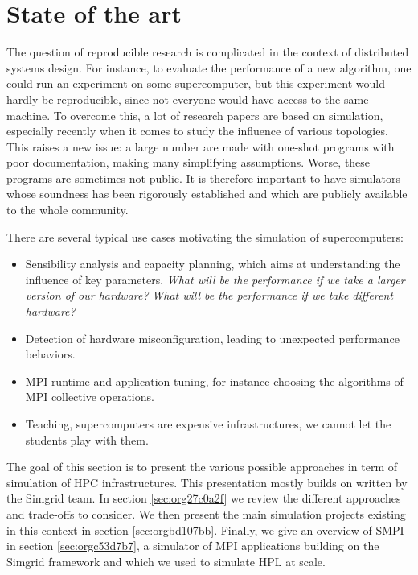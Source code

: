 \documentclass[12pt, a4paper]{memoir}
\begin{document}
\chapter{State of the art}
\label{sec:orgf52ffec}
The question of reproducible research is complicated in the context of distributed systems design. For instance, to
evaluate the performance of a new algorithm, one could run an experiment on some supercomputer, but this experiment
would hardly be reproducible, since not everyone would have access to the same machine. To overcome this, a lot of
research papers are based on simulation, especially recently when it comes to study the influence of various
topologies. This raises a new issue: a large number are made with one-shot programs with poor documentation, making
many simplifying assumptions. Worse, these programs are sometimes not public. It is therefore important to have
simulators whose soundness has been rigorously established and which are publicly available to the whole community.

There are several typical use cases motivating the simulation of supercomputers:
\begin{itemize}
\item Sensibility analysis and capacity planning, which aims at understanding the influence of key parameters. \emph{What will
be the performance if we take a larger version of our hardware?} \emph{What will be the performance if we take different
hardware?}
\item Detection of hardware misconfiguration, leading to unexpected performance behaviors.
\item MPI runtime and application tuning, for instance choosing the algorithms of MPI collective operations.
\item Teaching, supercomputers are expensive infrastructures, we cannot let the students play with them.
\end{itemize}

The goal of this section is to present the various possible approaches in term of simulation of HPC
infrastructures. This presentation mostly builds on \cite{casanova:hal-01017319,degomme:hal-01415484,legrand:tel-01247932} written by the
Simgrid team. In section \ref{sec:org27c0a2f} we review the different approaches and trade-offs to consider. We then present
the main simulation projects existing in this context in section \ref{sec:orgbd107bb}. Finally, we give an overview of SMPI
in section \ref{sec:orgc53d7b7}, a simulator of MPI applications building on the Simgrid framework and which we used to simulate
HPL at scale.
\end{document}
